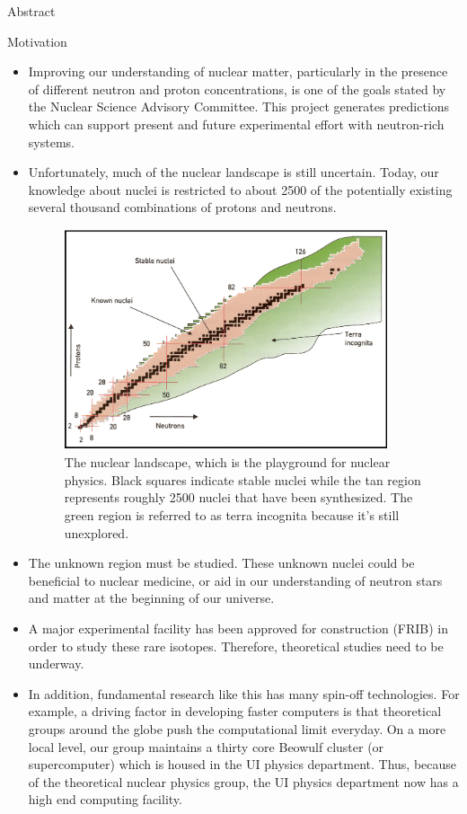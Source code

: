 \documentclass[serif]{beamer}
\begin{document}
\begin{frame}{}
\begin{columns}[t]
\begin{column}{0.32\paperwidth}
\begin{block}{Abstract}
\begin{figure}[H]
\end{figure}
\end{block}
\begin{block}{Motivation}
\begin{itemize}
\item Improving our understanding of nuclear matter, particularly in the presence of different neutron and proton concentrations, is one of the goals stated by the Nuclear Science Advisory Committee. This project generates predictions which can support present and future experimental effort with neutron-rich systems.  
\item \alert{Unfortunately, much of the nuclear landscape is still uncertain}. Today, our knowledge about nuclei is restricted to about 2500 of the potentially existing several thousand combinations of protons and neutrons.
\begin{figure}[H]
\begin{center}
\includegraphics[width=9.5cm,height=6.5cm]{landscape}
\caption{The nuclear landscape, which is the playground for nuclear physics. Black squares indicate stable nuclei while the tan region represents roughly 2500 nuclei that have been synthesized. The green region is referred to as terra incognita because it's still unexplored.\label{fig:landscape}}
\end{center}
\end{figure}
\item \alert{The unknown region must be studied}. These unknown nuclei could be beneficial to nuclear medicine, or aid in our understanding of neutron stars and matter at the beginning of our universe.
\item A major experimental facility has been approved for construction (FRIB) in order to study these rare isotopes. \alert{Therefore, theoretical studies need to be underway}.
\item In addition, fundamental research like this has many spin-off technologies. For example, a driving factor in developing faster computers is that theoretical groups around the globe push the computational limit everyday. On a more local level, our group maintains a thirty core Beowulf cluster (or supercomputer) which is housed in the UI physics department. Thus, because of the theoretical nuclear physics group, the UI physics department now has a high end computing facility. 

\end{itemize}
\end{block}
\end{column}
\end{columns}
\end{frame}
\end{document}
